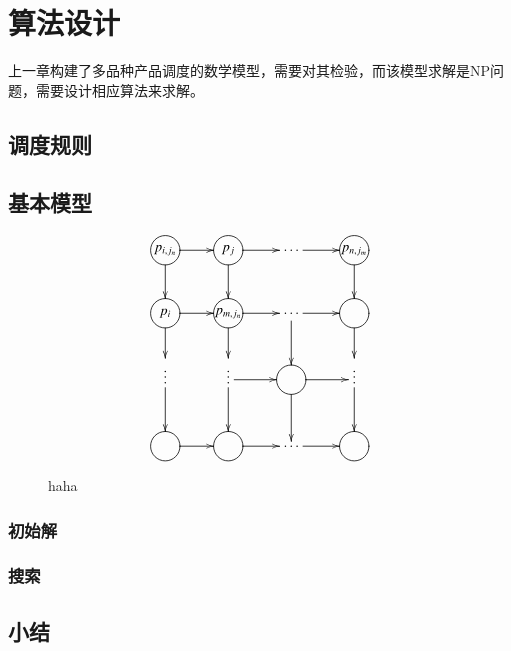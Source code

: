 \chapter{算法设计}
上一章构建了多品种产品调度的数学模型，需要对其检验，而该模型求解是NP问题，需要设计相应算法来求解。
\section{调度规则}

\section{基本模型}

\begin{figure}[h]
\newcommand{\process}[1]{*++=[o][F]{\makebox[1.5em]{$#1$}}}
\begin{equation*}
\xymatrix{
\process{p_{i,j_n}} \ar[r] \ar[d] & \process{p_j} \ar[d] \ar[r] & \cdots\ar[r] & \process{p_{n,j_m}} \ar[d]\\
\process{p_i} \ar[r]\ar[d] & \process{p_{m,j_n}} \ar[d]\ar[r] & \cdots \ar[r] \ar[d]& \process{} \ar[d] \\
\vdots\ar[d] & \vdots \ar[d]\ar[r] & \process{}\ar[r]\ar[d] &\vdots \ar[d]\\
\process{} \ar[r] & \process{} \ar[r] & \cdots\ar[r] & \process{} 
}
\end{equation*}
\caption{haha}
\end{figure}
\subsection{初始解}

\subsection{搜索}


\section{小结}